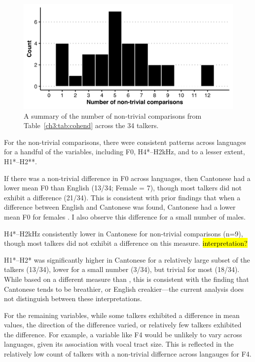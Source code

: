 \begin{figure}[htbp]
\begin{center}
\includegraphics[width=0.875\linewidth]{figures/ch3_nontrivial_counts_by_talker_5in.png} 
\caption{A summary of the number of non-trivial comparisons from Table~\ref{ch3:tab:cohend} across the 34 talkers.}
\label{ch3:fig:ntcounts}
\end{center}
\end{figure}

For the non-trivial comparisons, there were consistent patterns across languages for a handful of the variables, including F0, H4*--H2kHz, and to a lesser extent, H1*--H2**.

If there was a non-trivial difference in F0 across languages, then Cantonese had a lower mean F0 than English (13/34; Female = 7), though most talkers did not exhibit a difference (21/34). This is consistent with prior findings that when a difference between English and Cantonese was found, Cantonese had a lower mean F0 for females \citep{ng_2012_ltas,altenberg_2006_f0}. I also observe this difference for a small number of males.

H4*--H2kHz consistently lower in Cantonese for non-trivial comparisons (n=9), though most talkers did not exhibit a difference on this measure. \hl{interpretation?}

H1*--H2* was significantly higher in Cantonese for a relatively large subset of the talkers (13/34), lower for a small number (3/34), but trivial for most (18/34). While based on a different measure than \citep{ng_2012_ltas}, this is consistent with the finding that Cantonese tends to be breathier, or English creakier---the current analysis does not distinguish between these interpretations.

For the remaining variables, while some talkers exhibited a difference in mean values, the direction of the difference varied, or relatively few talkers exhibited the difference. For example, a variable like F4 would be unlikely to vary across languages, given its association with vocal tract size. This is reflected in the relatively low count of talkers with a non-trivial differnce across langauges for F4. 

